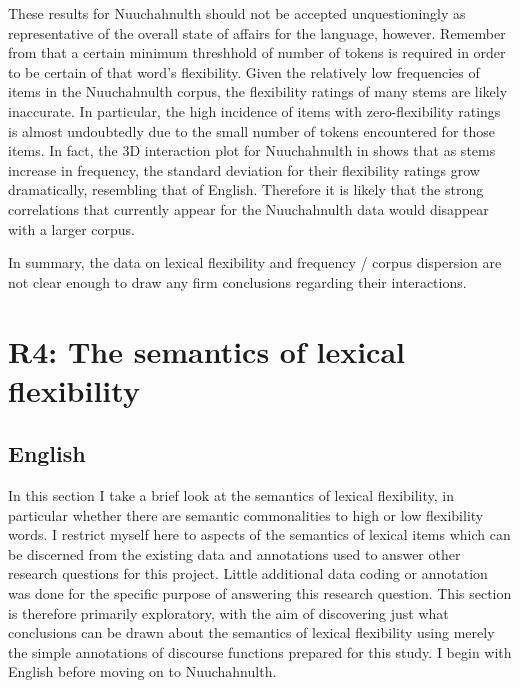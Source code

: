 These results for Nuuchahnulth should not be accepted unquestioningly as representative of the overall state of affairs for the language, however. Remember from  that a certain minimum threshhold of number of tokens is required in order to be certain of that word's flexibility. Given the relatively low frequencies of items in the Nuuchahnulth corpus, the flexibility ratings of many stems are likely inaccurate. In particular, the high incidence of items with zero-flexibility ratings is almost undoubtedly due to the small number of tokens encountered for those items. In fact, the 3D interaction plot for Nuuchahnulth in  shows that as stems increase in frequency, the standard deviation for their flexibility ratings grow dramatically, resembling that of English. Therefore it is likely that the strong correlations that currently appear for the Nuuchahnulth data would disappear with a larger corpus.

In summary, the data on lexical flexibility and frequency / corpus dispersion are not clear enough to draw any firm conclusions regarding their interactions.

\section{R4: The semantics of lexical flexibility}
\label{sec:4.6}

\subsection{English}
\label{sec:4.6.1}

In this section I take a brief look at the semantics of lexical flexibility, in particular whether there are semantic commonalities to high or low flexibility words. I restrict myself here to aspects of the semantics of lexical items which can be discerned from the existing data and annotations used to answer other research questions for this project. Little additional data coding or annotation was done for the specific purpose of answering this research question. This section is therefore primarily exploratory, with the aim of discovering just what conclusions can be drawn about the semantics of lexical flexibility using merely the simple annotations of discourse functions prepared for this study. I begin with English before moving on to Nuuchahnulth.

